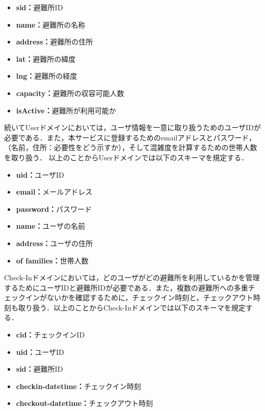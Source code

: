 \documentclass[technicalreport,dvipdfmx]{ieicej}
\begin{document}
\begin{itemize}
    \item{\textbf{sid：}}避難所ID
    \item{\textbf{name：}}避難所の名称
    \item{\textbf{address：}}避難所の住所
    \item{\textbf{lat：}}避難所の緯度
    \item{\textbf{lng：}}避難所の経度
    \item{\textbf{capacity：}}避難所の収容可能人数
    \item{\textbf{isActive：}}避難所が利用可能か
\end{itemize}

続いてUserドメインにおいては，ユーザ情報を一意に取り扱うためのユーザIDが必要である．また，本サービスに登録するためのemailアドレスとパスワード，（名前，住所：必要性をどう示すか），そして混雑度を計算するための世帯人数を取り扱う．%
以上のことからUserドメインでは以下のスキーマを規定する．

\begin{itemize}
    \item{\textbf{uid：}}ユーザID
    \item{\textbf{email：}}メールアドレス
    \item{\textbf{password：}}パスワード
    \item{\textbf{name：}}ユーザの名前
    \item{\textbf{address：}}ユーザの住所
    \item{\textbf{of families：}}世帯人数
\end{itemize}

Check-Inドメインにおいては，どのユーザがどの避難所を利用しているかを管理するためにユーザIDと避難所IDが必要である．また，複数の避難所への多重チェックインがないかを確認するために，チェックイン時刻と，チェックアウト時刻も取り扱う．以上のことからCheck-Inドメインでは以下のスキーマを規定する．

\begin{itemize}
    \item{\textbf{cid：}}チェックインID
    \item{\textbf{uid：}}ユーザID
    \item{\textbf{sid：}}避難所ID
    \item{\textbf{checkin-datetime：}}チェックイン時刻
    \item{\textbf{checkout-datetime：}}チェックアウト時刻
\end{itemize}
\end{document}
